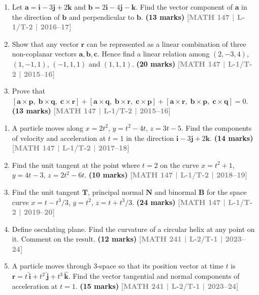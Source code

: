\documentclass[12pt,a4paper]{article}
\newcommand{\yr}[1]{\hfill\textcolor{gray}{\small\textbf{[#1]}}}
\newcommand{\mk}[1]{\textcolor{orange!70!black}{\small\textbf{(#1 marks)}}}
\begin{document}
\begin{enumerate}
\item Let $\mathbf{a}=\mathbf{i}-3\mathbf{j}+2\mathbf{k}$ and $\mathbf{b}=2\mathbf{i}-4\mathbf{j}-\mathbf{k}$. Find the vector component of $\mathbf{a}$ in the direction of $\mathbf{b}$ and perpendicular to $\mathbf{b}$.
\mk{13} \yr{MATH 147 | L-1/T-2 | 2016--17}

\item Show that any vector $\mathbf{r}$ can be represented as a linear combination of three non-coplanar vectors $\mathbf{a},\mathbf{b},\mathbf{c}$. Hence find a linear relation among $(2,-3,4)$, $(1,-1,1)$, $(-1,1,1)$ and $(1,1,1)$.
\mk{20} \yr{MATH 147 | L-1/T-2 | 2015--16}

\item Prove that $[\mathbf{a}\times\mathbf{p},\;\mathbf{b}\times\mathbf{q},\;\mathbf{c}\times\mathbf{r}]+[\mathbf{a}\times\mathbf{q},\;\mathbf{b}\times\mathbf{r},\;\mathbf{c}\times\mathbf{p}]+[\mathbf{a}\times\mathbf{r},\;\mathbf{b}\times\mathbf{p},\;\mathbf{c}\times\mathbf{q}]=0$.
\mk{13} \yr{MATH 147 | L-1/T-2 | 2015--16}

\end{enumerate}

\begin{enumerate}

\item A particle moves along $x=2t^{2}$, $y=t^{2}-4t$, $z=3t-5$. Find the components of velocity and acceleration at $t=1$ in the direction $\mathbf{i}-3\mathbf{j}+2\mathbf{k}$.
\mk{14} \yr{MATH 147 | L-1/T-2 | 2017--18}

\item Find the unit tangent at the point where $t=2$ on the curve $x=t^{2}+1$, $y=4t-3$, $z=2t^{2}-6t$.
\mk{10} \yr{MATH 147 | L-1/T-2 | 2018--19}

\item Find the unit tangent $\mathbf{T}$, principal normal $\mathbf{N}$ and binormal $\mathbf{B}$ for the space curve $x=t-t^{3}/3$, $y=t^{2}$, $z=t+t^{3}/3$.
\mk{24} \yr{MATH 147 | L-1/T-2 | 2019--20}

\item Define osculating plane. Find the curvature of a circular helix at any point on it. Comment on the result.
\mk{12} \yr{MATH 241 | L-2/T-1 | 2023--24}

\item A particle moves through 3-space so that its position vector at time $t$ is $\mathbf{r}=t\,\hat{\mathbf{i}}+t^{2}\,\hat{\mathbf{j}}+t^{3}\,\hat{\mathbf{k}}$. Find the vector tangential and normal components of acceleration at $t=1$.
\mk{15} \yr{MATH 241 | L-2/T-1 | 2023--24}

\end{enumerate}
\end{document}
